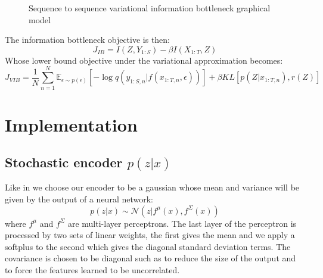 \documentclass[10pt,oneside,openright]{report}
\begin{document}
\begin{figure}[H]
\centering
{}
\caption{Sequence to sequence variational information bottleneck graphical model}
\end{figure}

The information bottleneck objective is then:
$$ J_{IB} = I(Z, Y_{1:S}) - \beta I(X_{1:T}, Z)$$
Whose lower bound objective under the variational approximation becomes:
 $$ J_{VIB} = \frac{1}{N}  \sum_{n=1}^{N} \mathbb{E}_{\epsilon \sim p(\epsilon)}[- \log q(y_{1:S, n} |f(x_{1:T, n}, \epsilon))] + \beta KL[p(Z|x_{1:T, n}), r(Z)]$$

\chapter{Implementation}
\section{Stochastic encoder $p(z|x)$}
Like in \cite{vib} we choose our encoder to be a gaussian whose mean and variance will be given by the output of a neural network:
$$ p(z|x) \sim \mathcal{N}(z | f^\mu(x), f^\Sigma(x))$$ where $f^\mu$ and $f^\Sigma$ are multi-layer perceptrons. The last layer of the perceptron is processed by two sets of linear weights, the first gives the mean and we apply a softplus to the second which gives the diagonal standard deviation terms. The covariance is chosen to be diagonal such as to reduce the size of the output and to force the features learned to be uncorrelated.
\end{document}
